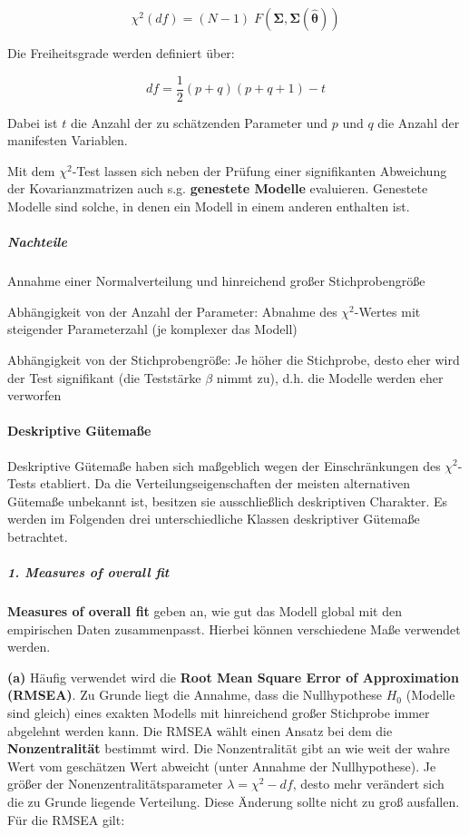 \documentclass{article}
\numberwithin{equation}{section}
\begin{document}
\begin{equation}
\chi^2 (df) = (N-1)\; F(\boldsymbol\Sigma, \boldsymbol\Sigma (\boldsymbol{\hat \theta}))
\end{equation}

Die Freiheitsgrade werden definiert über:

\begin{equation}
\label{eq:df}
df = \frac{1}{2}(p+q)(p+q+1)-t
\end{equation}

Dabei ist $t$ die Anzahl der zu schätzenden Parameter und $p$ und $q$ die Anzahl der manifesten Variablen.

Mit dem $\chi^2$-Test lassen sich neben der Prüfung einer signifikanten Abweichung der Kovarianzmatrizen auch s.g. \textbf{genestete Modelle} evaluieren. Genestete Modelle sind solche, in denen ein Modell in einem anderen enthalten ist. 

\subparagraph*{Nachteile}

\begin{compactitem}
\item Annahme einer Normalverteilung und hinreichend großer Stichprobengröße
\item Abhängigkeit von der Anzahl der Parameter: Abnahme des $\chi^2$-Wertes mit steigender Parameterzahl (je komplexer das Modell)
\item Abhängigkeit von der Stichprobengröße: Je höher die Stichprobe, desto eher wird der Test signifikant (die Teststärke $\beta$ nimmt zu), d.h. die Modelle werden eher verworfen
\end{compactitem}

\paragraph*{Deskriptive Gütemaße}

Deskriptive Gütemaße haben sich maßgeblich wegen der Einschränkungen des $\chi^2$-Tests etabliert. Da die Verteilungseigenschaften der meisten alternativen Gütemaße unbekannt ist, besitzen sie ausschließlich deskriptiven Charakter. Es werden im Folgenden drei unterschiedliche Klassen deskriptiver Gütemaße betrachtet.

\subparagraph*{1. Measures of overall fit}

\textbf{Measures of overall fit} geben an, wie gut das Modell global mit den empirischen Daten zusammenpasst. Hierbei können verschiedene Maße verwendet werden.

\textbf{(a)} Häufig verwendet wird die \textbf{Root Mean Square Error of Approximation (RMSEA)}. Zu Grunde liegt die Annahme, dass die Nullhypothese $H_0$ (Modelle sind gleich) eines exakten Modells mit hinreichend großer Stichprobe immer abgelehnt werden kann. Die RMSEA wählt einen Ansatz bei dem die \textbf{Nonzentralität} bestimmt wird. Die Nonzentralität gibt an wie weit der wahre Wert vom geschätzen Wert abweicht (unter Annahme der Nullhypothese). Je größer der Nonenzentralitätsparameter $\lambda = \chi^2 - df$, desto mehr verändert sich die zu Grunde liegende Verteilung. Diese Änderung sollte nicht zu groß ausfallen. Für die RMSEA gilt:
\end{document}
